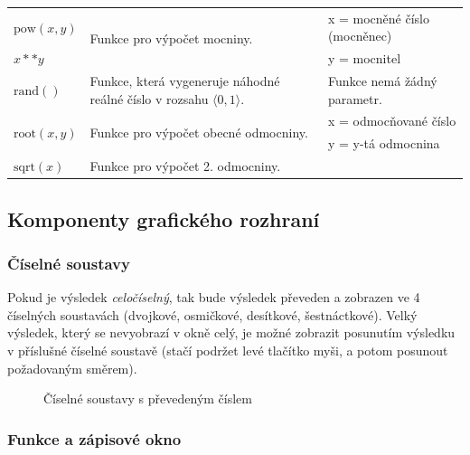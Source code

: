 \documentclass[a4paper, 11pt]{article}
\begin{document}
\begin{table}[H]
\begin{tabular}{|p{3cm}|p{6.25cm}|p{6.25cm}|}
        $\text{pow}(x,y)$   & \multirow{2}{*}{Funkce pro výpočet mocniny.}  & x = mocněné číslo (mocněnec) \\ \cline{1-1}
        $x**y$  &   & y = mocnitel \\ \cline{1-3}
        $\text{rand}()$  & Funkce, která vygeneruje náhodné reálné číslo v rozsahu $\langle 0, 1 \rangle$. & Funkce nemá žádný parametr. \\ \cline{1-3}
        \multirow{2}{*}{$\text{root}(x, y)$} & \multirow{2}{*}{Funkce pro výpočet obecné odmocniny.}  & x = odmocňované číslo \\
            &   & y = y-tá odmocnina \\ \cline{1-3}
        $\text{sqrt}(x)$    & Funkce pro výpočet 2. odmocniny. & \\ \cline{1-3}
    \end{tabular}
\end{table}

\subsection{Komponenty grafického rozhraní}

\subsubsection{Číselné soustavy}

Pokud je výsledek \emph{celočíselný}, tak bude výsledek převeden a
zobrazen ve 4 číselných soustavách (dvojkové, osmičkové, desítkové,
šestnáctkové). Velký výsledek, který se nevyobrazí v okně celý, je možné
zobrazit posunutím výsledku v příslušné číselné soustavě (stačí podržet levé tlačítko myši, a potom posunout požadovaným směrem).

\begin{figure}[H]
    \centering
    \caption{Číselné soustavy s převedeným číslem}
\end{figure}

\subsubsection{Funkce a zápisové okno}
\end{document}
